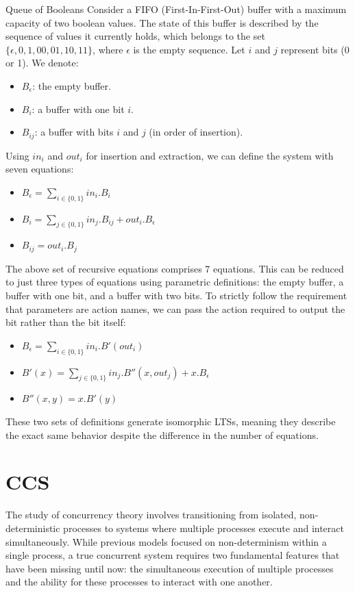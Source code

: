 \begin{Example}{Queue of Booleans}{}
Consider a FIFO (First-In-First-Out) buffer with a maximum capacity of two boolean values. The state of this buffer is described by the sequence of values it currently holds, which belongs to the set $\{\epsilon,0,1,00,01,10,11\}$, where $\epsilon$ is the empty sequence. Let $i$ and $j$ represent bits (0 or 1). We denote:
\begin{itemize}
    \item $B_\epsilon$: the empty buffer.
    \item $B_i$: a buffer with one bit $i$.
    \item $B_{ij}$: a buffer with bits $i$ and $j$ (in order of insertion).
\end{itemize}
    
Using $in_i$ and $out_i$ for insertion and extraction, we can define the system with seven equations:
\begin{itemize}
    \item $B_\epsilon=\sum_{i\in \{0,1\}}in_i.B_i$ 
    \item $B_i=\sum_{j\in \{0,1\}}in_j.B_{ij}+out_i.B_\epsilon$
    \item $B_{ij}=out_i.B_j$
\end{itemize}

The above set of recursive equations comprises 7 equations. This can be reduced to just three types of equations using parametric definitions: the empty buffer, a buffer with one bit, and a buffer with two bits. To strictly follow the requirement that parameters are action names, we can pass the action required to output the bit rather than the bit itself:
\begin{itemize}
    \item $B_\epsilon = \sum_{i\in \{0,1\}}in_i.B'(out_i)$
    \item $B'(x) = \sum_{j\in \{0,1\}}in_j.B''(x,out_j)+x.B_\epsilon$
    \item $B''(x,y)=x.B'(y)$
\end{itemize}
    
These two sets of definitions generate isomorphic LTSs, meaning they describe the exact same behavior despite the difference in the number of equations. 
\end{Example}

\chapter{CCS}
The study of concurrency theory involves transitioning from isolated, non-deterministic processes to systems where multiple processes execute and interact simultaneously. While previous models focused on non-determinism within a single process, a true concurrent system requires two fundamental features that have been missing until now: the simultaneous execution of multiple processes and the ability for these processes to interact with one another.

